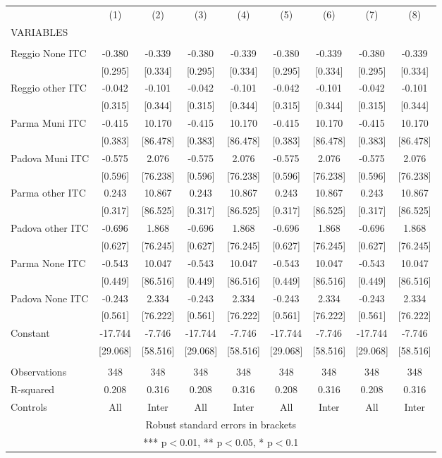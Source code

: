 \begin{tabular}{lcccccccc} \hline
 & (1) & (2) & (3) & (4) & (5) & (6) & (7) & (8) \\
VARIABLES &  &  &  &  &  &  &  &  \\ \hline
 &  &  &  &  &  &  &  &  \\
Reggio None ITC & -0.380 & -0.339 & -0.380 & -0.339 & -0.380 & -0.339 & -0.380 & -0.339 \\
 & [0.295] & [0.334] & [0.295] & [0.334] & [0.295] & [0.334] & [0.295] & [0.334] \\
Reggio other ITC & -0.042 & -0.101 & -0.042 & -0.101 & -0.042 & -0.101 & -0.042 & -0.101 \\
 & [0.315] & [0.344] & [0.315] & [0.344] & [0.315] & [0.344] & [0.315] & [0.344] \\
Parma Muni ITC & -0.415 & 10.170 & -0.415 & 10.170 & -0.415 & 10.170 & -0.415 & 10.170 \\
 & [0.383] & [86.478] & [0.383] & [86.478] & [0.383] & [86.478] & [0.383] & [86.478] \\
Padova Muni ITC & -0.575 & 2.076 & -0.575 & 2.076 & -0.575 & 2.076 & -0.575 & 2.076 \\
 & [0.596] & [76.238] & [0.596] & [76.238] & [0.596] & [76.238] & [0.596] & [76.238] \\
Parma other ITC & 0.243 & 10.867 & 0.243 & 10.867 & 0.243 & 10.867 & 0.243 & 10.867 \\
 & [0.317] & [86.525] & [0.317] & [86.525] & [0.317] & [86.525] & [0.317] & [86.525] \\
Padova other ITC & -0.696 & 1.868 & -0.696 & 1.868 & -0.696 & 1.868 & -0.696 & 1.868 \\
 & [0.627] & [76.245] & [0.627] & [76.245] & [0.627] & [76.245] & [0.627] & [76.245] \\
Parma None ITC & -0.543 & 10.047 & -0.543 & 10.047 & -0.543 & 10.047 & -0.543 & 10.047 \\
 & [0.449] & [86.516] & [0.449] & [86.516] & [0.449] & [86.516] & [0.449] & [86.516] \\
Padova None ITC & -0.243 & 2.334 & -0.243 & 2.334 & -0.243 & 2.334 & -0.243 & 2.334 \\
 & [0.561] & [76.222] & [0.561] & [76.222] & [0.561] & [76.222] & [0.561] & [76.222] \\
Constant & -17.744 & -7.746 & -17.744 & -7.746 & -17.744 & -7.746 & -17.744 & -7.746 \\
 & [29.068] & [58.516] & [29.068] & [58.516] & [29.068] & [58.516] & [29.068] & [58.516] \\
 &  &  &  &  &  &  &  &  \\
Observations & 348 & 348 & 348 & 348 & 348 & 348 & 348 & 348 \\
R-squared & 0.208 & 0.316 & 0.208 & 0.316 & 0.208 & 0.316 & 0.208 & 0.316 \\
 Controls & All & Inter & All & Inter & All & Inter & All & Inter \\ \hline
\multicolumn{9}{c}{ Robust standard errors in brackets} \\
\multicolumn{9}{c}{ *** p$<$0.01, ** p$<$0.05, * p$<$0.1} \\
\end{tabular}
